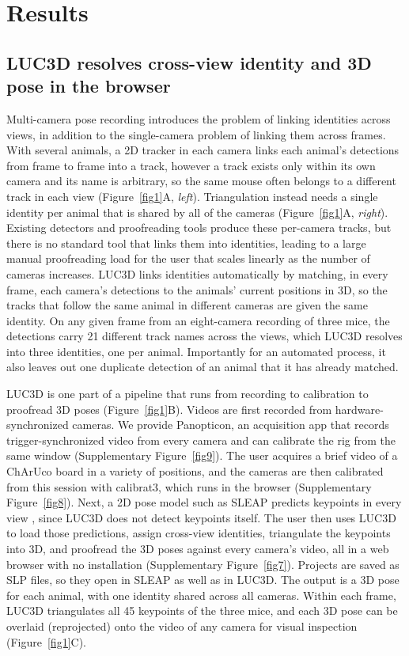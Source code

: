 \documentclass[pdflatex, sn-nature]{sn-jnl}
\theoremstyle{thmstyleone}%
\theoremstyle{thmstyletwo}%
\theoremstyle{thmstylethree}%
\begin{document}
\section{Results}\label{sec2}

\subsection{LUC3D resolves cross-view identity and 3D pose in the browser}\label{subsec2-1}

Multi-camera pose recording introduces the problem of linking identities across views, in addition to the single-camera problem of linking them across frames. With several animals, a 2D tracker in each camera links each animal's detections from frame to frame into a track, however a track exists only within its own camera and its name is arbitrary, so the same mouse often belongs to a different track in each view (Figure~\ref{fig1}A, \textit{left}). Triangulation instead needs a single identity per animal that is shared by all of the cameras (Figure~\ref{fig1}A, \textit{right}). Existing detectors and proofreading tools produce these per-camera tracks, but there is no standard tool that links them into identities, leading to a large manual proofreading load for the user that scales linearly as the number of cameras increases. LUC3D links identities automatically by matching, in every frame, each camera's detections to the animals' current positions in 3D, so the tracks that follow the same animal in different cameras are given the same identity. On any given frame from an eight-camera recording of three mice, the detections carry 21 different track names across the views, which LUC3D resolves into three identities, one per animal. Importantly for an automated process, it also leaves out one duplicate detection of an animal that it has already matched.

LUC3D is one part of a pipeline that runs from recording to calibration to proofread 3D poses (Figure~\ref{fig1}B). Videos are first recorded from hardware-synchronized cameras. We provide Panopticon, an acquisition app that records trigger-synchronized video from every camera and can calibrate the rig from the same window (Supplementary Figure~\ref{fig9}). The user acquires a brief video of a ChArUco board in a variety of positions, and the cameras are then calibrated from this session with calibrat3, which runs in the browser (Supplementary Figure~\ref{fig8}). Next, a 2D pose model such as SLEAP predicts keypoints in every view \citep{Pereira2022}, since LUC3D does not detect keypoints itself. The user then uses LUC3D to load those predictions, assign cross-view identities, triangulate the keypoints into 3D, and proofread the 3D poses against every camera's video, all in a web browser with no installation (Supplementary Figure~\ref{fig7}). Projects are saved as SLP files, so they open in SLEAP as well as in LUC3D. The output is a 3D pose for each animal, with one identity shared across all cameras. Within each frame, LUC3D triangulates all 45 keypoints of the three mice, and each 3D pose can be overlaid (reprojected) onto the video of any camera for visual inspection (Figure~\ref{fig1}C).
\end{document}
